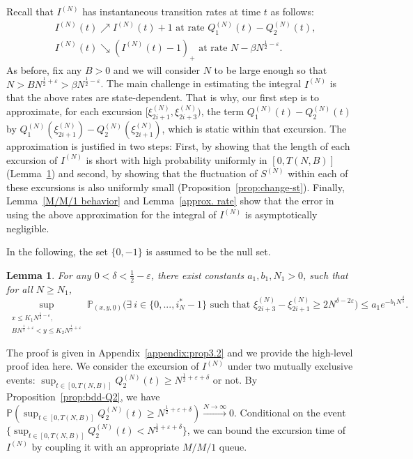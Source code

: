 \documentclass[11pt, reqno]{article}
\newtheorem{lemma}[theorem]{Lemma}
\numberwithin{equation}{section}
\numberwithin{theorem}{section}
\newcommand{\PP}{\mathbb{P}}  				%
\begin{document}
Recall that $I^{(N)}$ has instantaneous transition rates at time $t$ as follows:
\begin{equation}\label{eq:HAT-I}
\begin{split}
    &I^{(N)}(t)\nearrow I^{(N)}(t)+1 \text{  at rate  }Q_1^{(N)}(t)-Q_2^{(N)}(t),\\
    &I^{(N)}(t)\searrow (I^{(N)}(t)-1)_+ \text{  at rate  }N-\beta N^{\frac{1}{2}-\varepsilon}.
\end{split}
\end{equation}
As before, fix any $B>0$ and we will consider $N$ to be large enough so that $N>BN^{\frac{1}{2}+\varepsilon}>\beta N^{\frac{1}{2}-\varepsilon}$.
The main challenge in estimating the integral $I^{(N)}$ is that the above rates are state-dependent.
That is why, our first step is to approximate, for each excursion $[\xi^{(N)}_{2i+1},\xi^{(N)}_{2i+3})$, the term $Q_1^{(N)}(t)-Q_2^{(N)}(t)$ by $Q_1^{(N)}(\xi^{(N)}_{2i+1})-Q_2^{(N)}(\xi^{(N)}_{2i+1})$, which is static within that excursion.
The approximation is justified in two steps: First, by showing that 
the length of each excursion of $I^{(N)}$ is short with high probability uniformly in $[0,  T(N,B)]$ (Lemma~\ref{excursion time}) and second, by showing that the fluctuation of $S^{(N)}$ within each of these excursions is also uniformly small (Proposition~\ref{prop:change-st}).
Finally, Lemma~\ref{M/M/1 behavior} and Lemma~\ref{approx. rate} show that the error in using the above approximation for the integral of $I^{(N)}$ is asymptotically negligible.

In the following, the set $\{0,-1\}$ is assumed to be the null set.
\begin{lemma}\label{excursion time}
For any $0<\delta<\frac{1}{2}-\varepsilon$, there exist constants $a_1, b_1, N_1>0$, such that for all $N\geq N_1$,
\begin{equation}
\sup_{\substack{x\leq K_1N^{\frac{1}{2} - \varepsilon},\\ BN^{\frac{1}{2} + \varepsilon} <y\leq K_2N^{\frac{1}{2} + \varepsilon}}}\mathbb{P}_{(x,y, \underline{0})}\Big(\exists\ i \in\big\{0,...,i^*_N-1\big\}\text{  such that  } \xi^{(N)}_{2i+3}-\xi^{(N)}_{2i+1}\geq 2N^{\delta-2\varepsilon}\Big)\leq a_1e^{-b_1N^{\frac{\delta}{5}}}\label{idle excursion time}.
\end{equation}
\end{lemma}
The proof is given in Appendix~\ref{appendix:prop3.2} and we provide the high-level proof idea here. 
We consider the excursion of $I^{(N)}$ under two mutually exclusive events: $\sup_{t \in [0, T(N,B)]} Q^{(N)}_2(t)\geq N^{\frac{1}{2}+\varepsilon+\delta}$ or not. By Proposition~\ref{prop:bdd-Q2}, we have $\PP(\sup_{t \in [0, T(N,B)]}Q^{(N)}_2(t)\geq N^{\frac{1}{2}+\varepsilon+\delta})\xrightarrow{N\rightarrow\infty}0$. 
Conditional on the event $\{\sup_{t \in [0, T(N,B)]} Q^{(N)}_2(t) < N^{\frac{1}{2}+\varepsilon+\delta}\}$, we can bound the excursion time of $I^{(N)}$ by coupling it with an appropriate $M/M/1$ queue. 
\end{document}
